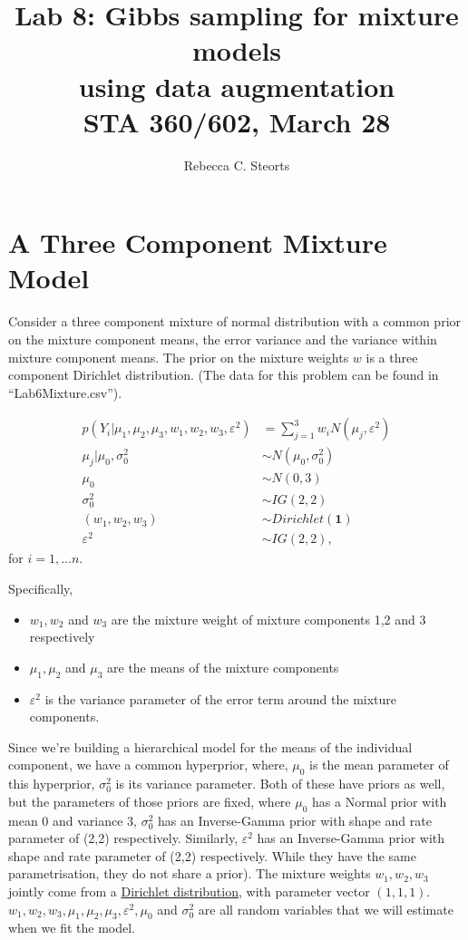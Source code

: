 \documentclass{article}
\title{Lab 8: Gibbs sampling for mixture models \\using data augmentation \\STA 360/602, March 28}
\author{Rebecca C. Steorts}
\begin{document}
\maketitle
\section*{A Three Component Mixture Model}

Consider a three component mixture of normal distribution with a common prior on the mixture component means, the error variance and the variance within mixture component means. The prior on the mixture weights $w$ is a three component Dirichlet distribution. (The data for this problem can be found in ``Lab6Mixture.csv'').

\begin{align*}
p(Y_i | \mu_1,\mu_2,\mu_3,w_1,w_2,w_3,\varepsilon^2) &= \sum_{j=1}^3 w_i N(\mu_j,\varepsilon^2)\\
\mu_j|\mu_0,\sigma_0^2 &\sim N(\mu_0,\sigma_0^2)\\
\mu_0 &\sim N(0,3)\\
\sigma_0^2 &\sim IG(2,2)\\
(w_1,w_2,w_3) &\sim Dirichlet(\mathbf{1})\\
\varepsilon^2 &\sim IG(2,2),
\end{align*}
for $i=1,\ldots n.$

Specifically, 
\begin{itemize}
\item $w_1,w_2$ and $w_3$ are the mixture weight of mixture components 1,2 and 3 respectively
\item $\mu_1,\mu_2$ and $\mu_3$ are the means of the mixture components 
\item $\varepsilon^2$ is the variance parameter of the error term around the mixture components. 
\end{itemize}

Since we're building a hierarchical model for the means of the individual component, we have a common hyperprior, where, $\mu_0$ is the mean parameter of this hyperprior, $\sigma_0^2$ is its variance parameter. Both of these have priors as well, but the parameters of those priors are fixed, where $\mu_0$ has a Normal prior with mean 0 and variance 3, $\sigma_0^2$ has an Inverse-Gamma prior with shape and rate parameter of (2,2) respectively. Similarly, $\varepsilon^2$ has an Inverse-Gamma prior with shape and rate parameter of (2,2) respectively. While they have the same parametrisation, they do not share a prior). The mixture weights $w_1,w_2,w_3$ jointly come from a \href{https://en.wikipedia.org/wiki/Dirichlet_distribution}{Dirichlet distribution}, with parameter vector $(1,1,1)$. $w_1,w_2,w_3,\mu_1,\mu_2,\mu_3,\varepsilon^2,\mu_0$ and $\sigma_0^2$ are all random variables that we will estimate when we fit the model.
\end{document}
